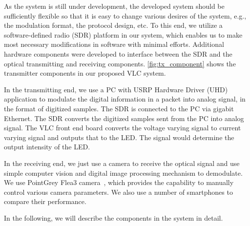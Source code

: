 As the system is still under development, the developed system should be sufficiently flexible so that it is easy to change various desires of the system, e.g., the modulation format, the protocol design, etc. 
To this end, we utilize a software-defined radio (SDR) platform in our system, which enables us to make most necessary modifications in software with minimal efforts. 
Additional hardware components were developed to interface between the SDR and the optical transmitting and receiving components. 
\autoref{fig:tx_component} shows the transmitter components in our proposed VLC system. 

In the transmitting end, we use a PC with USRP Hardware Driver (UHD) application to modulate the digital information in a packet into analog signal, in the format of digitized samples. 
The SDR is connected to the PC via gigabit Ethernet. The SDR converts the digitized samples sent from the PC into analog signal. 
The VLC front end board converts the voltage varying signal to current varying signal and outputs that to the LED. The signal would determine the output intensity of the LED. 

In the receiving end, we just use a camera to receive the optical signal and use simple computer vision and digital image processing mechanism to demodulate. We use PointGrey Flea3 camera~\cite{pointgrey_flea}, which provides the capability to manually control various camera parameters. We also use a number of smartphones to compare their performance.

In the following, we will describe the components in the system in detail.

